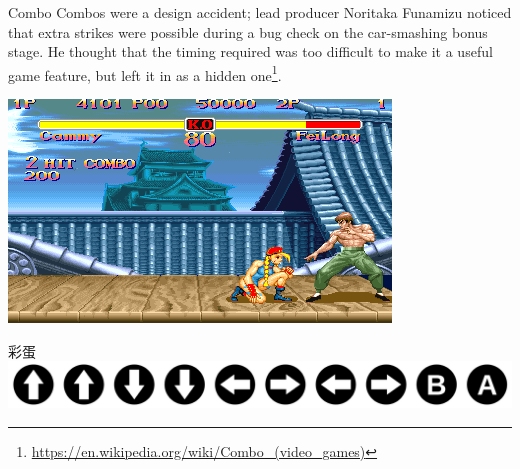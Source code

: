 \documentclass{beamer}
\begin{document}
\begin{frame}[t]{Combo}
    Combos were a design accident; lead producer Noritaka Funamizu noticed that extra strikes were possible during a bug check on the car-smashing bonus stage. He thought that the timing required was too difficult to make it a useful game feature, but left it in as a hidden one\footnote{\url{https://en.wikipedia.org/wiki/Combo_(video_games)}}.

    \includegraphics[width=.5\textwidth]{Super_Street_Fighter_II_screenshot.png}

\end{frame}

\begin{frame}[t]{彩蛋}
    \includegraphics[width=.5\textwidth]{1280px-Konami_Code.svg.png} 
\end{frame}
\end{document}
